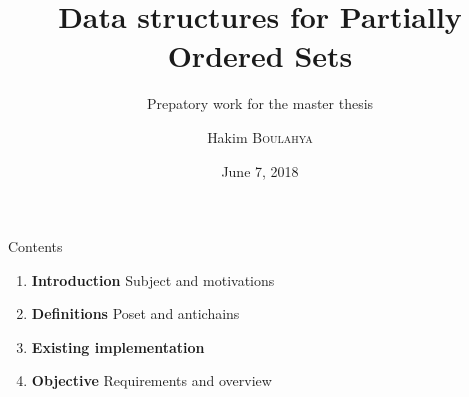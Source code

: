 \documentclass[10pt]{beamer}
\title{Data structures for Partially Ordered Sets}  %
\subtitle{Prepatory work for the master thesis}
\date{June 7, 2018}
\author{
  Hakim \textsc{Boulahya}
}
\institute[
  Faculty of Science
  Université Libre de Bruxelles
  Belgium
] %
{%
    supervised by \\
    Emmanuel Filiot and
    Guillermo A. Pérez \\\

  Département d'Informatique \\
  Université Libre de Bruxelles \\
  Belgium

}
\begin{document}
{\aauwavesbg%
\begin{frame} %
  \titlepage
\end{frame}}

\begin{frame}{Contents}{}

\begin{block}{}
  \begin{enumerate}
    \item \textcolor{firstcolor}{\textbf{Introduction}}
     Subject and motivations
    \item \textcolor{firstcolor}{\textbf{Definitions}}
     Poset and antichains
     \item \textcolor{firstcolor}{\textbf{Existing implementation}}
    \item \textcolor{firstcolor}{\textbf{Objective}}
     Requirements and overview
  \end{enumerate}
\end{block}

\end{frame}

\end{document}
